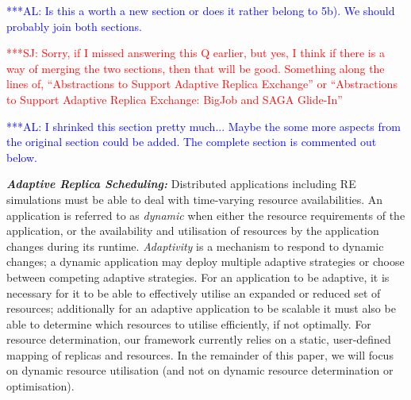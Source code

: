 \documentclass{rspublic}
\newcommand{\alnote}[1]{ {\textcolor{blue} { ***AL: #1 }}}
\newcommand{\jhanote}[1]{ {\textcolor{red} { ***SJ: #1 }}}
\newcommand{\alnote}[1]{}
\newcommand{\jhanote}[1]{}
\begin{document}
\label{sec:adaptivitiy}    
\alnote{Is this a worth a new section or does it rather belong to
  5b). We should probably join both sections.}  

\jhanote{Sorry, if I missed answering this Q earlier, but yes, I think
  if there is a way of merging the two sections, then that will be
  good. Something along the lines of, ``Abstractions to Support
  Adaptive Replica Exchange'' or ``Abstractions to Support Adaptive
  Replica Exchange: BigJob and SAGA Glide-In''}

\alnote{I shrinked this section pretty much... Maybe the some more
    aspects from the original section could be added. The complete
    section is commented out below.}

  {\noindent \it \bf Adaptive Replica Scheduling:} Distributed applications
  including RE simulations must be able to deal with time-varying
  resource availabilities.  An application is referred to as
  \emph{dynamic} when either the resource requirements of the
  application, or the availability and utilisation of resources by the
  application changes during its runtime.  \emph{Adaptivity} is a
  mechanism to respond to dynamic
  changes; %
  a dynamic application may deploy multiple adaptive strategies or
  choose between competing adaptive strategies.  For an application to
  be adaptive, it is necessary for it to be able to effectively
  utilise an expanded or reduced set of resources; additionally for an
  adaptive application to be scalable it must also be able to
  determine which resources to utilise efficiently, if not optimally.
  For resource determination, our framework currently relies on a
  static, user-defined mapping of replicas and resources.  In the
  remainder of this paper, we will focus on dynamic resource
  utilisation (and not on dynamic resource determination or
  optimisation).
\end{document}
